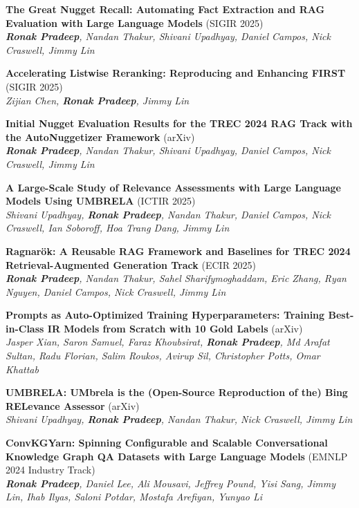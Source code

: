 \documentclass[letterpaper,12pt]{article}
\newcommand{\resumeItem}[0]{
  \item\small{ \vspace{-2pt}
  }
}
\begin{document}
  \resumeItem{\textbf{The Great Nugget Recall: Automating Fact Extraction and RAG Evaluation with Large Language Models} (SIGIR 2025)}\\
\textit{\textbf{Ronak Pradeep}, Nandan Thakur, Shivani Upadhyay, Daniel Campos, Nick Craswell, Jimmy Lin}


  \resumeItem{\textbf{Accelerating Listwise Reranking: Reproducing and Enhancing FIRST} (SIGIR 2025)}\\
\textit{Zijian Chen, \textbf{Ronak Pradeep}, Jimmy Lin}

\resumeItem{\textbf{Initial Nugget Evaluation Results for the TREC 2024 RAG Track with the AutoNuggetizer Framework} (arXiv)}\\
\textit{\textbf{Ronak Pradeep}, Nandan Thakur, Shivani Upadhyay, Daniel Campos, Nick Craswell, Jimmy Lin}
  \resumeItem{\textbf{A Large-Scale Study of Relevance Assessments with Large Language Models Using UMBRELA} (ICTIR 2025)}\\
\textit{Shivani Upadhyay, \textbf{Ronak Pradeep}, Nandan Thakur, Daniel Campos, Nick Craswell, Ian Soboroff, Hoa Trang Dang, Jimmy Lin}

  \resumeItem{\textbf{Ragnarök: A Reusable RAG Framework and Baselines for TREC 2024 Retrieval-Augmented Generation Track} (ECIR 2025)}\\
\textit{\textbf{Ronak Pradeep}, Nandan Thakur, Sahel Sharifymoghaddam, Eric Zhang, Ryan Nguyen, Daniel Campos, Nick Craswell, Jimmy Lin} 

\resumeItem{\textbf{Prompts as Auto-Optimized Training Hyperparameters: Training Best-in-Class IR Models from Scratch with 10 Gold Labels} (arXiv)}\\
\textit{Jasper Xian, Saron Samuel, Faraz Khoubsirat, \textbf{Ronak Pradeep}, Md Arafat Sultan, Radu Florian, Salim Roukos, Avirup Sil, Christopher Potts, Omar Khattab}

\resumeItem{\textbf{UMBRELA: UMbrela is the (Open-Source Reproduction of the) Bing RELevance Assessor} (arXiv)}\\
\textit{Shivani Upadhyay, \textbf{Ronak Pradeep}, Nandan Thakur, Nick Craswell, Jimmy Lin} 

\resumeItem{\textbf{ConvKGYarn: Spinning Configurable and Scalable Conversational Knowledge Graph QA Datasets with Large Language Models} (EMNLP 2024 Industry Track)}\\
\textit{\textbf{Ronak Pradeep}, Daniel Lee, Ali Mousavi, Jeffrey Pound, Yisi Sang, Jimmy Lin, Ihab Ilyas, Saloni Potdar, Mostafa Arefiyan, Yunyao Li}
\end{document}
